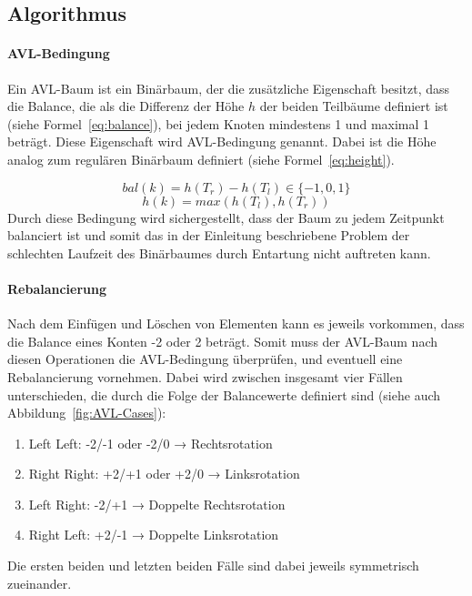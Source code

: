 \subsection{Algorithmus}\label{subsec:algorithmus}

\paragraph{AVL-Bedingung}
Ein AVL-Baum ist ein Binärbaum, der die zusätzliche Eigenschaft besitzt, dass
die Balance, die als die Differenz der Höhe $h$ der beiden
Teilbäume definiert ist (siehe Formel~\ref{eq:balance}), bei jedem Knoten mindestens 1 und
maximal 1 beträgt.
Diese Eigenschaft wird AVL-Bedingung genannt.
Dabei ist die Höhe analog zum regulären Binärbaum definiert (siehe Formel~\ref{eq:height}).

\begin{equation}
    bal(k) = h(T_r) - h(T_l)\label{eq:balance} \in \{-1,0,1\}
\end{equation}
\begin{equation}
    h(k) = max(h(T_l), h(T_r))\label{eq:height}
\end{equation}
Durch diese Bedingung wird sichergestellt, dass der Baum zu jedem Zeitpunkt
balanciert ist und somit das in der Einleitung beschriebene Problem der
schlechten Laufzeit des Binärbaumes durch Entartung nicht auftreten kann.

\paragraph{Rebalancierung}\label{par:rebalancing}
Nach dem Einfügen und Löschen von Elementen kann es jeweils vorkommen, dass die
Balance eines Konten -2 oder 2 beträgt.
Somit muss der AVL-Baum nach diesen Operationen die AVL-Bedingung überprüfen,
und eventuell eine Rebalancierung vornehmen.
Dabei wird zwischen insgesamt vier Fällen unterschieden, die durch die Folge
der Balancewerte definiert sind (siehe auch Abbildung~\ref{fig:AVL-Cases}):
\begin{enumerate}
    \item Left Left: -2/-1 oder -2/0 → Rechtsrotation\label{enm:rebal1}
    \item Right Right: +2/+1 oder +2/0 → Linksrotation \label{enm:rebal2}
    \item Left Right: -2/+1 → Doppelte Rechtsrotation \label{enm:rebal3}
    \item Right Left: +2/-1 → Doppelte Linksrotation \label{enm:rebal4}
\end{enumerate}
Die ersten beiden und letzten beiden Fälle sind dabei jeweils symmetrisch zueinander.

